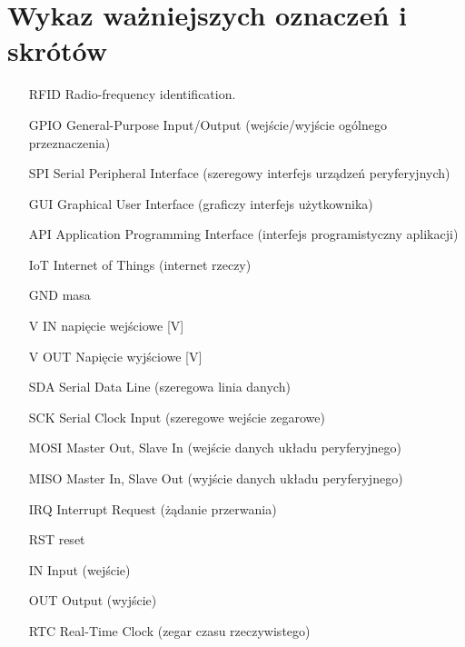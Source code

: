 \section*{Wykaz ważniejszych oznaczeń i skrótów}


	\begin{itemize}
		\item[RFID] Radio-frequency identification.
		\item[GPIO] General-Purpose Input/Output (wejście/wyjście ogólnego przeznaczenia)
		\item[SPI] Serial Peripheral Interface (szeregowy interfejs urządzeń peryferyjnych)
		\item[GUI] Graphical User Interface (graficzy interfejs użytkownika)
		\item[API] Application Programming Interface (interfejs programistyczny aplikacji)
		\item[IoT] Internet of Things (internet rzeczy)
		\item[GND] masa
		\item[V IN] napięcie wejściowe [V]
		\item[V OUT] Napięcie wyjściowe [V]
		\item[SDA] Serial Data Line (szeregowa linia danych)
		\item[SCK] Serial Clock Input (szeregowe wejście zegarowe)
		\item[MOSI] Master Out, Slave In (wejście danych układu peryferyjnego)
		\item[MISO] Master In, Slave Out (wyjście danych układu peryferyjnego)
		\item[IRQ] Interrupt Request (żądanie przerwania)
		\item[RST] reset
		\item[IN] Input (wejście)
		\item[OUT] Output (wyjście)
		\item[RTC] Real-Time Clock (zegar czasu rzeczywistego)
	\end{itemize}



